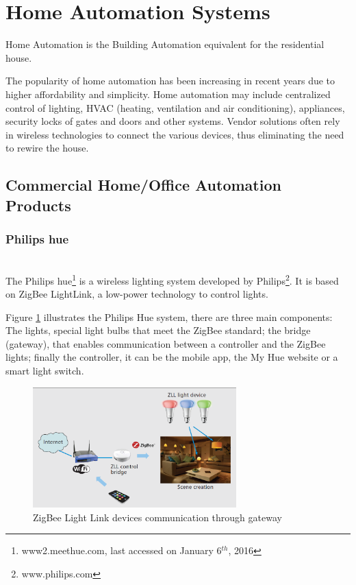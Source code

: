 \section{Home Automation Systems} \label{ssec:num1}

Home Automation is the Building Automation equivalent for the residential house.

The popularity of home automation has been increasing in recent years due to higher affordability and simplicity. Home automation  may include centralized control of lighting, HVAC (heating, ventilation and air conditioning), appliances, security locks of gates and doors and other systems.
Vendor solutions often rely in wireless technologies to connect the various devices, thus eliminating the need to rewire the house.

\subsection{Commercial Home/Office Automation Products}



\subsubsection{Philips hue}\mbox{}\\



The Philips hue\footnote{www2.meethue.com, last accessed on January 6$^{th}$, 2016} is a wireless lighting system developed by Philips\footnote{www.philips.com}. It is based on ZigBee LightLink\cite{zigbee:ZLL}, a low-power technology to control lights.

Figure \ref{fig:zll} illustrates the Philips Hue system, there are three main components: The lights, special light bulbs that meet the ZigBee standard; the bridge (gateway), that enables communication between a controller and the ZigBee lights; finally the controller, it can be the mobile app, the My Hue website or a smart light switch.


\begin{figure}[h]
\centering
\includegraphics[width=0.7\textwidth]{Figures/philips_hue_refazer}
\caption{ZigBee Light Link devices communication through gateway}
\label{fig:zll}
\end{figure}

